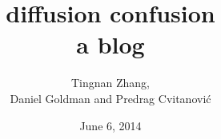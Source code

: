 \documentclass[10pt,openany]{book}
\begin{document}
        \date{June 6, 2014} \Private{\date{\today}}

\title{ 			diffusion confusion
       \\ \Huge 	a blog
        \\\vspace{1.0cm}
        }\author{
		Tingnan Zhang,
		\\
        Daniel Goldman
         and
        Predrag Cvitanovi\'{c}
        }

%
\maketitle

\thispagestyle{empty}
\tableofcontents





\newpage
\printbibliography[title={References}] %
%


\end{document}
